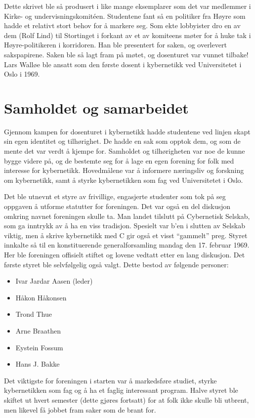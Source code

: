 Dette skrivet ble så produsert i like mange eksemplarer som det var medlemmer i Kirke- og undervisningskomitéen. Studentene fant så en politiker fra Høyre som hadde et relativt stort behov for å markere seg. Som ekte lobbyister dro en av dem (Rolf Lind) til Stortinget i forkant av et av komiteens møter for å huke tak i Høyre-politikeren i korridoren. Han ble presentert for saken, og overlevert sakspapirene. Saken ble så lagt fram på møtet, og dosenturet var vunnet tilbake!
Lars Walløe ble ansatt som den første dosent i kybernetikk ved Universitetet i Oslo i 1969.

\section{Samholdet og samarbeidet}

Gjennom kampen for dosenturet i kybernetikk hadde studentene ved linjen skapt sin egen identitet og tilhørighet. De hadde en sak som opptok dem, og som de mente det var verdt å kjempe for. Samholdet og tilhørigheten var noe de kunne bygge videre på, og de bestemte seg for å lage en egen forening for folk med interesse for kybernetikk. Hovedmålene var å informere næringsliv og forskning om kybernetikk, samt å styrke kybernetikken som fag ved Universitetet i Oslo.

Det ble utnevnt et styre av frivillige, engasjerte studenter som tok på seg oppgaven å utforme statutter for foreningen. Det var også en del diskusjon omkring navnet foreningen skulle ta. Man landet tilslutt på Cybernetisk Selskab, som ga inntrykk av å ha en viss tradisjon. Spesielt var b'en i slutten av Selskab viktig, men å skrive kybernetikk med C gir også et visst ``gammelt'' preg. Styret innkalte så til en konstituerende generalforsamling mandag den 17. februar 1969. Her ble foreningen offisielt stiftet og lovene vedtatt etter en lang diskusjon. Det første styret ble selvfølgelig også valgt. Dette bestod av følgende personer:

\begin{itemize}
\item Ivar Jardar Aasen (leder)
\item Håkon Håkonsen
\item Trond Thue
\item Arne Braathen
\item Eystein Fossum
\item Hans J. Bakke
\end{itemize}

Det viktigste for foreningen i starten var å markedsføre studiet, styrke kybernetikken som fag og å ha et faglig interessant program. Halve styret ble skiftet ut hvert semester (dette gjøres fortsatt) for at folk ikke skulle bli utbrent, men likevel få jobbet fram saker som de brant for.

